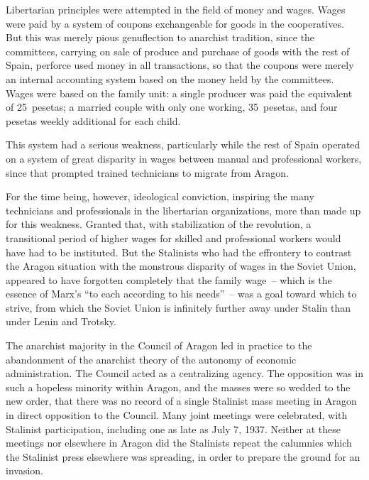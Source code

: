 Libertarian principles were attempted in the field of money and wages. Wages were paid by a system of coupons exchangeable for goods in the cooperatives. But this was merely pious genuflection to anarchist tradition, since the committees, carrying on sale of produce and purchase of goods with the rest of Spain, perforce used money in all transactions, so that the coupons were merely an internal accounting system based on the money held by the committees. Wages were based on the family unit: a single producer was paid the equivalent of 25~pesetas; a married couple with only one working, 35~pesetas, and four pesetas weekly additional for each child.

This system had a serious weakness, particularly while the rest of Spain operated on a system of great disparity in wages between%
%
%
manual and professional workers, since that prompted trained technicians to migrate from Aragon.

\vskip -1pt

For the time being, however\kn, ideological conviction, inspiring the many technicians and professionals in the libertarian organizations, more than made up for this weakness. Granted that, with stabilization of the revolution, a transitional period of higher wages for skilled and professional workers would have had to be instituted. But the Stalinists who had the effrontery to contrast the Aragon situation with the monstrous disparity of wages in the Soviet Union, appeared to have forgotten completely that the family wage~-- which is the essence of Marx’s ``to each according to his needs''~-- was a goal toward which to strive, from which the Soviet Union is infinitely further away under Stalin than under Lenin and Trotsky.

\vskip -1pt

The anarchist majority in the Council of Aragon led in practice to the abandonment of the anarchist theory of the autonomy of economic administration. The Council acted as a centralizing agency. The opposition was in such a hopeless minority within Aragon, and the masses were so wedded to the new order, that there was no record of a single Stalinist mass meeting in Aragon in direct opposition to the Council. Many joint meetings were celebrated, with Stalinist participation, including one as late as July 7, 1937\kn. Neither at these meetings nor elsewhere in Aragon did the Stalinists repeat the calumnies which the Stalinist press elsewhere was spreading, in order to prepare the ground for an invasion.

